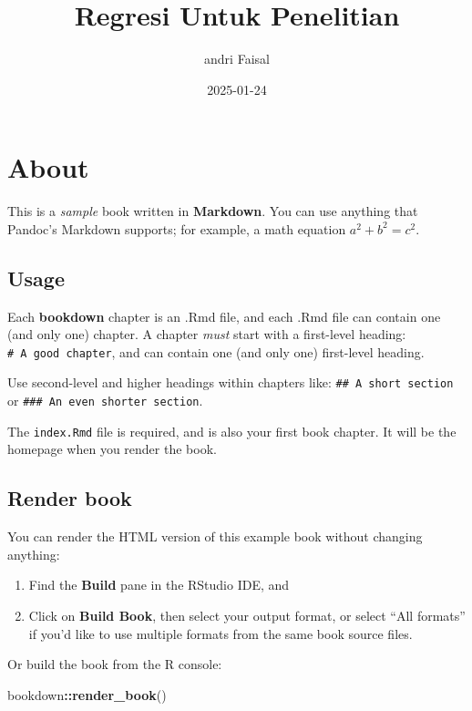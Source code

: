 \documentclass[
]{book}
\title{Regresi Untuk Penelitian}
\author{andri Faisal}
\date{2025-01-24}
\newenvironment{Shaded}{\begin{snugshade}}{\end{snugshade}}
\newcommand{\FunctionTok}[1]{\textcolor[rgb]{0.13,0.29,0.53}{\textbf{#1}}}
\newcommand{\NormalTok}[1]{#1}
\newcommand{\SpecialCharTok}[1]{\textcolor[rgb]{0.81,0.36,0.00}{\textbf{#1}}}
\theoremstyle{definition}
\theoremstyle{definition}
\theoremstyle{definition}
\theoremstyle{definition}
\theoremstyle{remark}
\begin{document}
\maketitle

{
\setcounter{tocdepth}{1}
\tableofcontents
}
\hypertarget{about}{%
\chapter{About}\label{about}}

This is a \emph{sample} book written in \textbf{Markdown}. You can use anything that Pandoc's Markdown supports; for example, a math equation \(a^2 + b^2 = c^2\).

\hypertarget{usage}{%
\section{Usage}\label{usage}}

Each \textbf{bookdown} chapter is an .Rmd file, and each .Rmd file can contain one (and only one) chapter. A chapter \emph{must} start with a first-level heading: \texttt{\#\ A\ good\ chapter}, and can contain one (and only one) first-level heading.

Use second-level and higher headings within chapters like: \texttt{\#\#\ A\ short\ section} or \texttt{\#\#\#\ An\ even\ shorter\ section}.

The \texttt{index.Rmd} file is required, and is also your first book chapter. It will be the homepage when you render the book.

\hypertarget{render-book}{%
\section{Render book}\label{render-book}}

You can render the HTML version of this example book without changing anything:

\begin{enumerate}
\def\labelenumi{\arabic{enumi}.}
\item
  Find the \textbf{Build} pane in the RStudio IDE, and
\item
  Click on \textbf{Build Book}, then select your output format, or select ``All formats'' if you'd like to use multiple formats from the same book source files.
\end{enumerate}

Or build the book from the R console:

\begin{Shaded}
\begin{Highlighting}[]
\NormalTok{bookdown}\SpecialCharTok{::}\FunctionTok{render\_book}\NormalTok{()}
\end{Highlighting}
\end{Shaded}
\end{document}
